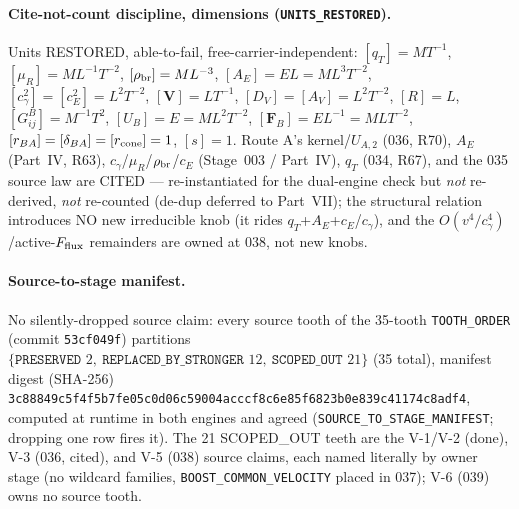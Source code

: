 \paragraph{Cite-not-count discipline, dimensions (\texttt{UNITS\_RESTORED}).}
Units RESTORED, able-to-fail, free-carrier-independent: \([q_T]=MT^{-1}\),
\([\mu_R]=ML^{-1}T^{-2}\), \([\rho_{\rm br}]=ML^{-3}\), \([A_E]=EL=ML^3T^{-2}\),
\([c_\gamma^2]=[c_E^2]=L^2T^{-2}\), \([\mathbf V]=LT^{-1}\),
\([D_V]=[A_V]=L^2T^{-2}\), \([R]=L\), \([G^B_{ij}]=M^{-1}T^2\),
\([U_B]=E=ML^2T^{-2}\), \([\mathbf F_B]=EL^{-1}=MLT^{-2}\),
\([r_{BA}]=[\delta_{BA}]=[r_{\rm cone}]=1\), \([s]=1\). Route A's
kernel/\(U_{A,2}\) (036, R70), \(A_E\) (Part~IV, R63), \(c_\gamma\)/\(\mu_R\)/\(\rho_{\rm br}\)/\(c_E\) (Stage~003 / Part~IV), \(q_T\) (034,
R67), and the 035 source law are CITED --- re-instantiated for the
dual-engine check but \emph{not} re-derived, \emph{not} re-counted
(de-dup deferred to Part~VII); the structural relation introduces NO new
irreducible knob (it rides \(q_T\)+\(A_E\)+\(c_E\)/\(c_\gamma\)), and the
\(O(v^4/c_\gamma^4)\)/active-\(F_{\rm flux}\) remainders are owned at 038,
not new knobs.

\paragraph{Source-to-stage manifest.}
No silently-dropped source claim: every source tooth of the 35-tooth
\texttt{TOOTH\_ORDER} (commit \texttt{53cf049f}) partitions
\(\{\texttt{PRESERVED }2,\ \texttt{REPLACED\_BY\_STRONGER }12,\ \texttt{SCOPED\_OUT }21\}\)
(35 total), manifest digest (SHA-256)
\texttt{3c88849c5f4f5b7fe05c0d06c59004acccf8c6e85f6823b0e839c41174c8adf4},
computed at runtime in both engines and agreed
(\texttt{SOURCE\_TO\_STAGE\_MANIFEST}; dropping one row fires it). The 21
SCOPED\_OUT teeth are the V-1/V-2 (done), V-3 (036, cited), and V-5 (038)
source claims, each named literally by owner stage (no wildcard families,
\texttt{BOOST\_COMMON\_VELOCITY} placed in 037); V-6 (039) owns no source
tooth.

